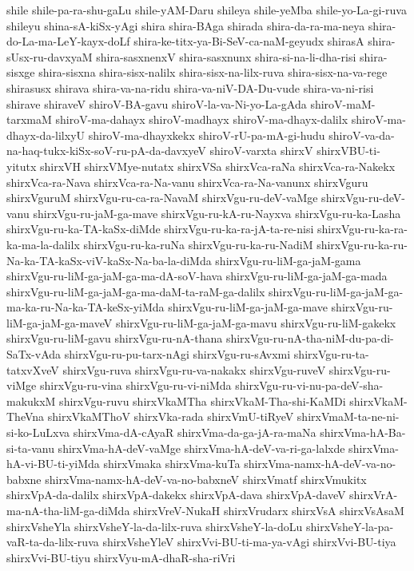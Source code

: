 {shile
shile-pa-ra-shu-gaLu
shile-yAM-Daru
shileya
shile-yeMba
shile-yo-La-gi-ruva
shileyu
shina-sA-kiSx-yAgi
shira
shira-BAga
shirada
shira-da-ra-ma-neya
shira-do-La-ma-LeY-kayx-doLf
shira-ke-titx-ya-Bi-SeV-ca-naM-geyudx
shirasA
shira-sUsx-ru-davxyaM
shira-sasxnenxV
shira-sasxnunx
shira-si-na-li-dha-risi
shira-sisxge
shira-sisxna
shira-sisx-nalilx
shira-sisx-na-lilx-ruva
shira-sisx-na-va-rege
shirasusx
shirava
shira-va-na-ridu
shira-va-niV-DA-Du-vude
shira-va-ni-risi
shirave
shiraveV
shiroV-BA-gavu
shiroV-la-va-Ni-yo-La-gAda
shiroV-maM-tarxmaM
shiroV-ma-dahayx
shiroV-madhayx
shiroV-ma-dhayx-dalilx
shiroV-ma-dhayx-da-lilxyU
shiroV-ma-dhayxkekx
shiroV-rU-pa-mA-gi-hudu
shiroV-va-da-na-haq-tukx-kiSx-soV-ru-pA-da-davxyeV
shiroV-varxta
shirxV
shirxVBU-ti-yitutx
shirxVH
shirxVMye-nutatx
shirxVSa
shirxVca-raNa
shirxVca-ra-Nakekx
shirxVca-ra-Nava
shirxVca-ra-Na-vanu
shirxVca-ra-Na-vanunx
shirxVguru
shirxVguruM
shirxVgu-ru-ca-ra-NavaM
shirxVgu-ru-deV-vaMge
shirxVgu-ru-deV-vanu
shirxVgu-ru-jaM-ga-mave
shirxVgu-ru-kA-ru-Nayxva
shirxVgu-ru-ka-Lasha
shirxVgu-ru-ka-TA-kaSx-diMde
shirxVgu-ru-ka-ra-jA-ta-re-nisi
shirxVgu-ru-ka-ra-ka-ma-la-dalilx
shirxVgu-ru-ka-ruNa
shirxVgu-ru-ka-ru-NadiM
shirxVgu-ru-ka-ru-Na-ka-TA-kaSx-viV-kaSx-Na-ba-la-diMda
shirxVgu-ru-liM-ga-jaM-gama
shirxVgu-ru-liM-ga-jaM-ga-ma-dA-soV-hava
shirxVgu-ru-liM-ga-jaM-ga-mada
shirxVgu-ru-liM-ga-jaM-ga-ma-daM-ta-raM-ga-dalilx
shirxVgu-ru-liM-ga-jaM-ga-ma-ka-ru-Na-ka-TA-keSx-yiMda
shirxVgu-ru-liM-ga-jaM-ga-mave
shirxVgu-ru-liM-ga-jaM-ga-maveV
shirxVgu-ru-liM-ga-jaM-ga-mavu
shirxVgu-ru-liM-gakekx
shirxVgu-ru-liM-gavu
shirxVgu-ru-nA-thana
shirxVgu-ru-nA-tha-niM-du-pa-di-SaTx-vAda
shirxVgu-ru-pu-tarx-nAgi
shirxVgu-ru-sAvxmi
shirxVgu-ru-ta-tatxvXveV
shirxVgu-ruva
shirxVgu-ru-va-nakakx
shirxVgu-ruveV
shirxVgu-ru-viMge
shirxVgu-ru-vina
shirxVgu-ru-vi-niMda
shirxVgu-ru-vi-nu-pa-deV-sha-makukxM
shirxVgu-ruvu
shirxVkaMTha
shirxVkaM-Tha-shi-KaMDi
shirxVkaM-TheVna
shirxVkaMThoV
shirxVka-rada
shirxVmU-tiRyeV
shirxVmaM-ta-ne-ni-si-ko-LuLxva
shirxVma-dA-cAyaR
shirxVma-da-ga-jA-ra-maNa
shirxVma-hA-Ba-si-ta-vanu
shirxVma-hA-deV-vaMge
shirxVma-hA-deV-va-ri-ga-lalxde
shirxVma-hA-vi-BU-ti-yiMda
shirxVmaka
shirxVma-kuTa
shirxVma-namx-hA-deV-va-no-babxne
shirxVma-namx-hA-deV-va-no-babxneV
shirxVmatf
shirxVmukitx
shirxVpA-da-dalilx
shirxVpA-dakekx
shirxVpA-dava
shirxVpA-daveV
shirxVrA-ma-nA-tha-liM-ga-diMda
shirxVreV-NukaH
shirxVrudarx
shirxVsA
shirxVsAsaM
shirxVsheYla
shirxVsheY-la-da-lilx-ruva
shirxVsheY-la-doLu
shirxVsheY-la-pa-vaR-ta-da-lilx-ruva
shirxVsheYleV
shirxVvi-BU-ti-ma-ya-vAgi
shirxVvi-BU-tiya
shirxVvi-BU-tiyu
shirxVyu-mA-dhaR-sha-riVri
}
